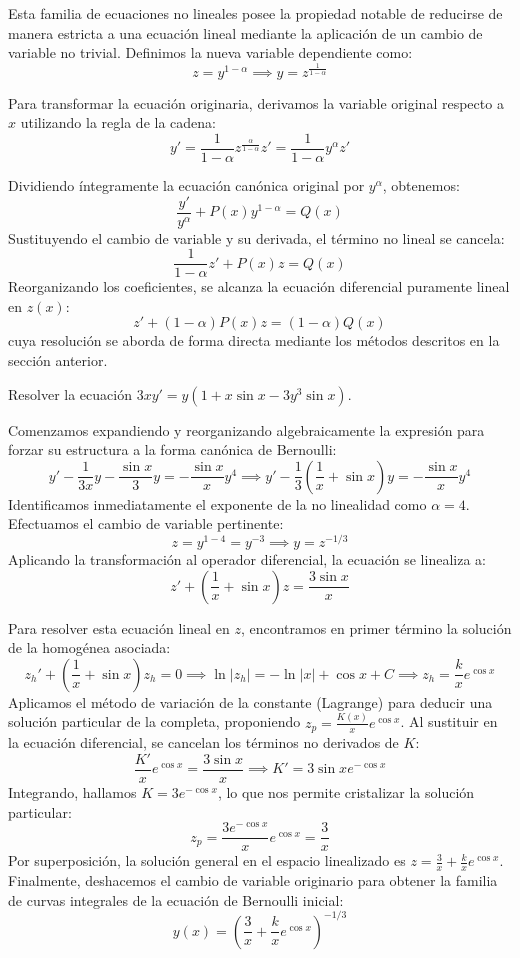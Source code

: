 Esta familia de ecuaciones no lineales posee la propiedad notable de reducirse de manera estricta a una ecuación lineal mediante la aplicación de un cambio de variable no trivial. Definimos la nueva variable dependiente como:
$$ z = y^{1-\alpha} \implies y = z^{\frac{1}{1-\alpha}} $$

Para transformar la ecuación originaria, derivamos la variable original respecto a $x$ utilizando la regla de la cadena:
$$ y' = \frac{1}{1-\alpha} z^{\frac{\alpha}{1-\alpha}} z' = \frac{1}{1-\alpha} y^\alpha z' $$

Dividiendo íntegramente la ecuación canónica original por $y^\alpha$, obtenemos:
$$ \frac{y'}{y^\alpha} + P(x)y^{1-\alpha} = Q(x) $$
Sustituyendo el cambio de variable y su derivada, el término no lineal se cancela:
$$ \frac{1}{1-\alpha} z' + P(x)z = Q(x) $$
Reorganizando los coeficientes, se alcanza la ecuación diferencial puramente lineal en $z(x)$:
$$ z' + (1-\alpha)P(x)z = (1-\alpha)Q(x) $$
cuya resolución se aborda de forma directa mediante los métodos descritos en la sección anterior.

\begin{ejercicio}
Resolver la ecuación $3xy' = y(1 + x \sin x - 3y^3 \sin x)$.
\end{ejercicio}

\begin{tcolorbox}
Comenzamos expandiendo y reorganizando algebraicamente la expresión para forzar su estructura a la forma canónica de Bernoulli:
$$ y' - \frac{1}{3x}y - \frac{\sin x}{3}y = -\frac{\sin x}{x}y^4 \implies y' - \frac{1}{3}\left(\frac{1}{x} + \sin x\right)y = -\frac{\sin x}{x}y^4 $$
Identificamos inmediatamente el exponente de la no linealidad como $\alpha = 4$. Efectuamos el cambio de variable pertinente:
$$ z = y^{1-4} = y^{-3} \implies y = z^{-1/3} $$
Aplicando la transformación al operador diferencial, la ecuación se linealiza a:
$$ z' + \left(\frac{1}{x} + \sin x\right)z = \frac{3\sin x}{x} $$

Para resolver esta ecuación lineal en $z$, encontramos en primer término la solución de la homogénea asociada:
$$ z_h' + \left(\frac{1}{x} + \sin x\right)z_h = 0 \implies \ln|z_h| = -\ln|x| + \cos x + C \implies z_h = \frac{k}{x}e^{\cos x} $$
Aplicamos el método de variación de la constante (Lagrange) para deducir una solución particular de la completa, proponiendo $z_p = \frac{K(x)}{x}e^{\cos x}$. Al sustituir en la ecuación diferencial, se cancelan los términos no derivados de $K$:
$$ \frac{K'}{x}e^{\cos x} = \frac{3\sin x}{x} \implies K' = 3\sin x e^{-\cos x} $$
Integrando, hallamos $K = 3e^{-\cos x}$, lo que nos permite cristalizar la solución particular:
$$ z_p = \frac{3e^{-\cos x}}{x}e^{\cos x} = \frac{3}{x} $$
Por superposición, la solución general en el espacio linealizado es $z = \frac{3}{x} + \frac{k}{x}e^{\cos x}$.
Finalmente, deshacemos el cambio de variable originario para obtener la familia de curvas integrales de la ecuación de Bernoulli inicial:
$$ y(x) = \left( \frac{3}{x} + \frac{k}{x}e^{\cos x} \right)^{-1/3} $$
\end{tcolorbox}

